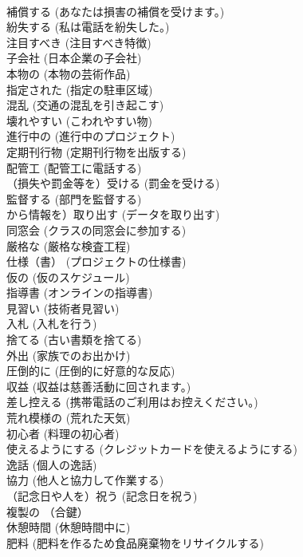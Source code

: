 \documentclass[8pt]{extreport}
\begin{document}
\begin{CJK}{UTF8}{min}
\\	補償する	(あなたは損害の補償を受けます。)		
\\	紛失する	(私は電話を紛失した。)		
\\	注目すべき	(注目すべき特徴)		
\\	子会社	(日本企業の子会社)		
\\	本物の	(本物の芸術作品)		
\\	指定された	(指定の駐車区域)		
\\	混乱	(交通の混乱を引き起こす)		
\\	壊れやすい	(こわれやすい物)		
\\	進行中の	(進行中のプロジェクト)		
\\	定期刊行物	(定期刊行物を出版する)		
\\	配管工	(配管工に電話する)		
\\	（損失や罰金等を）受ける	(罰金を受ける)		
\\	監督する	(部門を監督する)		
\\	から情報を）取り出す	(データを取り出す)		
\\	同窓会	(クラスの同窓会に参加する)		
\\	厳格な	(厳格な検査工程)		
\\	仕様（書）	(プロジェクトの仕様書)		
\\	仮の	(仮のスケジュール)		
\\	指導書	(オンラインの指導書)		
\\	見習い	(技術者見習い)		
\\	入札	(入札を行う)		
\\	捨てる	(古い書類を捨てる)		
\\	外出	(家族でのお出かけ)		
\\	圧倒的に	(圧倒的に好意的な反応)		
\\	収益	(収益は慈善活動に回されます。)		
\\	差し控える	(携帯電話のご利用はお控えください。)		
\\	荒れ模様の	(荒れた天気)		
\\	初心者	(料理の初心者)		
\\	使えるようにする	(クレジットカードを使えるようにする)		
\\	逸話	(個人の逸話)		
\\	協力	(他人と協力して作業する)		
\\	（記念日や人を）祝う	(記念日を祝う)		
\\	複製の	（合鍵）		
\\	休憩時間	(休憩時間中に)		
\\	肥料	(肥料を作るため食品廃棄物をリサイクルする)		

\end{CJK}
\end{document}
